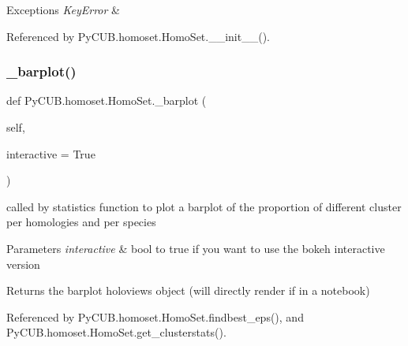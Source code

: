 \begin{DoxyExceptions}{Exceptions}
{\em Key\+Error} & \\
\hline
\end{DoxyExceptions}


Referenced by Py\+C\+U\+B.\+homoset.\+Homo\+Set.\+\_\+\+\_\+init\+\_\+\+\_\+().

\mbox{\label{class_py_c_u_b_1_1homoset_1_1_homo_set_af6e8927ae33e2785ab21293a59628946}} 
\subsubsection{\texorpdfstring{\+\_\+barplot()}{\_barplot()}}
{\footnotesize\ttfamily def Py\+C\+U\+B.\+homoset.\+Homo\+Set.\+\_\+barplot (\begin{DoxyParamCaption}\item[{}]{self,  }\item[{}]{interactive = {\ttfamily True} }\end{DoxyParamCaption})\hspace{0.3cm}{\ttfamily [private]}}



called by statistics function to plot a barplot of the proportion of different cluster per homologies and per species 


\begin{DoxyParams}{Parameters}
{\em interactive} & bool to true if you want to use the bokeh interactive version \\
\hline
\end{DoxyParams}
\begin{DoxyReturn}{Returns}
the barplot holoviews object (will directly render if in a notebook) 
\end{DoxyReturn}


Referenced by Py\+C\+U\+B.\+homoset.\+Homo\+Set.\+findbest\+\_\+eps(), and Py\+C\+U\+B.\+homoset.\+Homo\+Set.\+get\+\_\+clusterstats().

\mbox{\label{class_py_c_u_b_1_1homoset_1_1_homo_set_afd51ea6276ecae41960d426ce72755b0}} 
